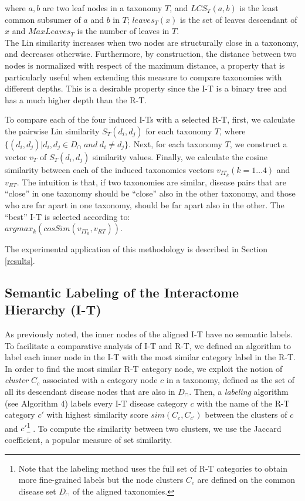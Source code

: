 \documentclass[journal,twoside,web]{ieeecolor}
\begin{document}
\noindent
where $a, b$ are two leaf nodes in a taxonomy $T$, and $LCS_{T}(a,b)$ is the least common subsumer of $a$ and $b$ in  $T$; $leaves_{T}(x)$ is the set of leaves descendant of $x$ and $MaxLeaves_{T}$ is the number of leaves in $T$.\\
The  Lin similarity increases when two  nodes are structurally close in a taxonomy, and decreases otherwise. Furthermore, by construction, the distance between two nodes is normalized with respect of the maximum distance, a property that is particularly useful when extending this measure to   compare taxonomies  with different depths.  This is a desirable property since the I-T is a binary tree and has a much higher depth than the R-T.  

To compare each of the four induced I-Ts with a selected R-T, first, we calculate the pairwise Lin similarity $S_{T}(d_i, d_j)$ 
 for each taxonomy $T$, where $\{(d_i, d_j)| d_i, d_j \in D_{\cap}\;and\;d_i \neq d_j \}$. Next, for each taxonomy $T$, we construct  a vector $v_T$ of $S_{T}(d_i, d_j)$  similarity values. Finally, we   calculate the cosine similarity between each of the induced taxonomies vectors $v_{IT_k} (k=1\dots 4)$  and $v_{RT}$. The intuition  is that, if  two taxonomies are similar, disease pairs that are ``close'' in one taxonomy should be ``close'' also in the other taxonomy, and those who are far apart in one taxonomy, should be far apart also in the other.  The ``best'' I-T is selected according to:\\
 \noindent
 $argmax_{k}(cosSim(v_{IT_k},v_{RT}))$.

The experimental application of this methodology is described in Section \ref{results}.


\vspace{-9pt}
\subsection{Semantic Labeling of the Interactome Hierarchy (I-T)}
\label{sec:labelling}
As previously noted, the inner nodes of the aligned I-T have no semantic labels. To facilitate a comparative analysis of I-T and R-T, we defined an algorithm to label each inner node in the  I-T with the most similar category label in the  R-T. In order to find the most similar R-T category node, we exploit the notion of  \textit{cluster} $C_c$ associated with a category node $c$ in a taxonomy, defined as the set of all its descendant disease nodes  that are also in $D_{\cap}$. Then, a \textit{labeling} algorithm (see Algorithm
4) labels every I-T disease category $c$ with the name of the R-T  category  $c'$ with highest  similarity score $sim(C_c,C_{c'})$  between the clusters of $c$ and $c'$\footnote{Note that the labeling method uses the full set of R-T categories to obtain more fine-grained labels
but the node clusters $C_c$ are defined on the common  disease set $D_{\cap}$ of the aligned taxonomies.} . To compute the similarity between two clusters, we use the  Jaccard coefficient, a popular measure of set similarity. 
\end{document}
